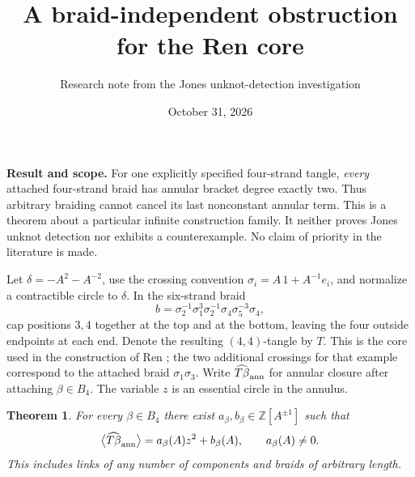\documentclass[11pt]{article}
\title{A braid-independent obstruction for the Ren core}
\author{Research note from the Jones unknot-detection investigation}
\date{October 31, 2026}
\newtheorem{theorem}{Theorem}
\newcommand{\Z}{\mathbb Z}
\begin{document}
\maketitle
\noindent\textbf{Result and scope.}
For one explicitly specified four-strand tangle, \emph{every} attached four-strand braid has annular bracket degree exactly two. Thus arbitrary braiding cannot cancel its last nonconstant annular term. This is a theorem about a particular infinite construction family. It neither proves Jones unknot detection nor exhibits a counterexample. No claim of priority in the literature is made.

\medskip
Let $\delta=-A^2-A^{-2}$, use the crossing convention
$\sigma_i=A\,1+A^{-1}e_i$, and normalize a contractible circle to $\delta$.
In the six-strand braid
\[
 b=\sigma_2^{-1}\sigma_1^3\sigma_2^{-1}
       \sigma_4\sigma_5^{-3}\sigma_4,
\]
cap positions $3,4$ together at the top and at the bottom, leaving the four outside endpoints at each end. Denote the resulting $(4,4)$-tangle by $T$. This is the core used in the construction of Ren \cite{Ren}; the two additional crossings for that example correspond to the attached braid $\sigma_1\sigma_3$. Write $\widehat{T\beta}_{\rm ann}$ for annular closure after attaching $\beta\in B_4$. The variable $z$ is an essential circle in the annulus.

\begin{theorem}
For every $\beta\in B_4$ there exist $a_\beta,b_\beta\in\Z[A^{\pm1}]$ such that
\[
 \big\langle\widehat{T\beta}_{\rm ann}\big\rangle
       =a_\beta(A)z^2+b_\beta(A),\qquad a_\beta(A)\ne0.
\]
This includes links of any number of components and braids of arbitrary length.
\end{theorem}
\end{document}
